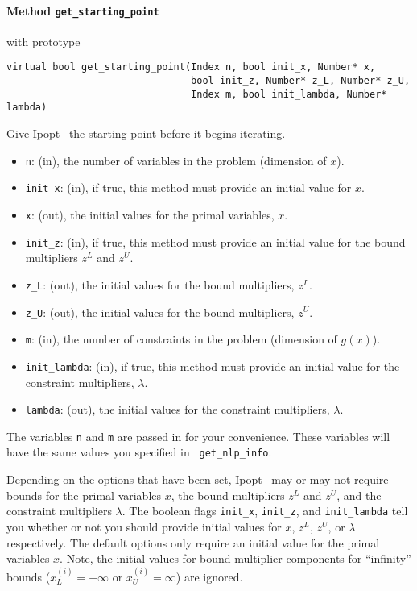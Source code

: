 \documentclass[10pt]{article}
\newcommand{\Ipopt}{{\sc Ipopt }}
\begin{document}
\paragraph{Method {\texttt{get\_starting\_point}}} with prototype
\begin{verbatim}
virtual bool get_starting_point(Index n, bool init_x, Number* x,
                                bool init_z, Number* z_L, Number* z_U,
                                Index m, bool init_lambda, Number* lambda)
\end{verbatim}
Give \Ipopt\ the starting point before it begins iterating.
\begin{itemize}
\item {\tt n}: (in), the number of variables in the problem (dimension of $x$). 
\item {\tt init\_x}: (in), if true, this method must provide an initial value for $x$.
\item {\tt x}: (out), the initial values for the primal variables, $x$.
\item {\tt init\_z}: (in), if true, this method must provide an initial value 
        for the bound multipliers $z^L$ and $z^U$.
\item {\tt z\_L}: (out), the initial values for the bound multipliers, $z^L$.
\item {\tt z\_U}: (out), the initial values for the bound multipliers, $z^U$.
\item {\tt m}: (in), the number of constraints in the problem (dimension of $g(x)$).
\item {\tt init\_lambda}: (in), if true, this method must provide an initial value 
        for the constraint multipliers, $\lambda$.
\item {\tt lambda}: (out), the initial values for the constraint multipliers, $\lambda$.
\end{itemize}

The variables {\tt n} and {\tt m} are passed in for your convenience.
These variables will have the same values you specified in {\tt
  get\_nlp\_info}.

Depending on the options that have been set, \Ipopt\ may or may not
require bounds for the primal variables $x$, the bound multipliers
$z^L$ and $z^U$, and the constraint multipliers $\lambda$. The boolean
flags {\tt init\_x}, {\tt init\_z}, and {\tt init\_lambda} tell you
whether or not you should provide initial values for $x$, $z^L$, $z^U$, or
$\lambda$ respectively. The default options only require an initial
value for the primal variables $x$.  Note, the initial values for
bound multiplier components for ``infinity'' bounds
($x_L^{(i)}=-\infty$ or $x_U^{(i)}=\infty$) are ignored.
\end{document}
